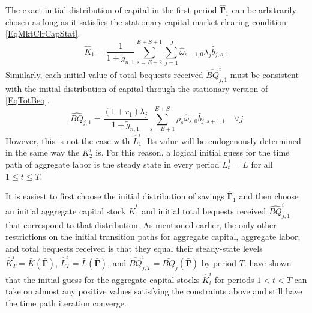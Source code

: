 \documentclass[letterpaper,12pt]{article}
\theoremstyle{definition}
\begin{document}
  The exact initial distribution of capital in the first period $\bm{\hat{\Gamma}}_1$ can be arbitrarily chosen as long as it satisfies the stationary capital market clearing condition \eqref{EqMktClrCapStat}.
  \begin{equation}\label{EqMktClrCapStat1}
    \hat{K}_1 = \frac{1}{1 + \tilde{g}_{n,1}}\sum_{s=E+2}^{E+S+1}\sum_{j=1}^{J}\hat{\omega}_{s-1,0}\lambda_j \hat{b}_{j,s,1}
  \end{equation}
  Simiilarly, each initial value of total bequests received $\hat{BQ}_{j,1}^i$ must be consistent with the initial distribution of capital through the stationary version of \eqref{EqTotBeq}.
  \begin{equation}\label{EqTotBeqStat1}
    \hat{BQ}_{j,1} = \frac{(1+r_1)\lambda_j}{1+\tilde{g}_{n,1}}\sum_{s=E+1}^{E+S}\rho_s\hat{\omega}_{s,0}\hat{b}_{j,s+1,1} \quad\forall j
  \end{equation}
  However, this is not the case with $\hat{L}_1^i$. Its value will be endogenously determined in the same way the $K_2^i$ is. For this reason, a logical initial guess for the time path of aggregate labor is the steady state in every period $L_t^1 = \bar{L}$ for all $1\leq t\leq T$.

  It is easiest to first choose the initial distribution of savings $\bm{\hat{\Gamma}}_1$ and then choose an initial aggregate capital stock $\hat{K}_1^i$ and initial total bequests received $\hat{BQ}_{j,1}^i$ that correspond to that distribution. As mentioned earlier, the only other restrictions on the initial transition paths for aggregate capital, aggregate labor, and total bequests received is that they equal their steady-state levels $\hat{K}_T^i = \bar{K}\left(\bm{\bar{\Gamma}}\right)$, $\hat{L}_T^i = \bar{L}\left(\bm{\bar{\Gamma}}\right)$, and $\hat{BQ}_{j,T}^i = \bar{BQ}_j\left(\bm{\bar{\Gamma}}\right)$ by period $T$. \citet{EvansPhillips:2014} have shown that the initial guess for the aggregate capital stocks $\hat{K}_t^i$ for periods $1<t<T$ can take on almost any positive values satisfying the constraints above and still have the time path iteration converge.
\end{document}
